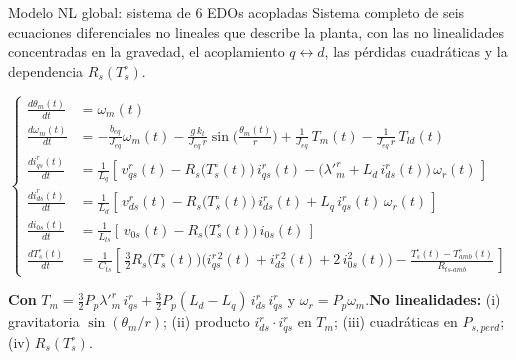 \documentclass[aspectratio=169,t]{beamer}
\begin{document}
\begin{frame}{Modelo NL global: sistema de 6 EDOs acopladas}
{\small\color{uncGray}Sistema completo de seis ecuaciones diferenciales no lineales que describe la planta, con las no linealidades concentradas en la gravedad, el acoplamiento $q\!\leftrightarrow\!d$, las pérdidas cuadráticas y la dependencia $R_s(T_s^\circ)$.}\par
\vspace{2mm}

\footnotesize
\begin{equation*}
\left\{
\begin{aligned}
\frac{d\theta_m(t)}{dt} &= \omega_m(t) \\[1pt]
\frac{d\omega_m(t)}{dt} &= -\tfrac{b_{eq}}{J_{eq}}\omega_m(t) - \tfrac{g\,k_l}{J_{eq}\,r}\sin\!\big(\tfrac{\theta_m(t)}{r}\big) + \tfrac{1}{J_{eq}}\,T_m(t) - \tfrac{1}{J_{eq}\,r}\,T_{ld}(t) \\[1pt]
\frac{di_{qs}^{r}(t)}{dt} &= \tfrac{1}{L_q}\!\left[\,v_{qs}^{r}(t) - R_s\!\big(T_s^\circ(t)\big)\, i_{qs}^{r}(t) - \big(\lambda'^r_m + L_d\,i_{ds}^{r}(t)\big)\,\omega_r(t)\,\right] \\[1pt]
\frac{di_{ds}^{r}(t)}{dt} &= \tfrac{1}{L_d}\!\left[\,v_{ds}^{r}(t) - R_s\!\big(T_s^\circ(t)\big)\, i_{ds}^{r}(t) + L_q\,i_{qs}^{r}(t)\,\omega_r(t)\,\right] \\[1pt]
\frac{di_{0s}(t)}{dt} &= \tfrac{1}{L_{ls}}\!\left[\,v_{0s}(t) - R_s\!\big(T_s^\circ(t)\big)\, i_{0s}(t)\,\right] \\[1pt]
\frac{dT_s^\circ(t)}{dt} &= \tfrac{1}{C_{ts}}\!\left[\,\tfrac{3}{2}R_s\!\big(T_s^\circ(t)\big)\big(i_{qs}^{r\,2}(t)+i_{ds}^{r\,2}(t)+2\,i_{0s}^{2}(t)\big) - \tfrac{T_s^\circ(t) - T_{amb}^\circ(t)}{R_{ts\text{-}amb}}\,\right]
\end{aligned}\right.
\end{equation*}
\normalsize

\vspace{1mm}
{\small \textbf{Con} $T_m = \tfrac{3}{2}P_p\lambda'^r_m\,i_{qs}^{r} + \tfrac{3}{2}P_p(L_d-L_q)\,i_{ds}^{r}\,i_{qs}^{r}$ \;y\; $\omega_r = P_p\omega_m$.\quad \textbf{No linealidades:} (i) gravitatoria $\sin(\theta_m/r)$; (ii) producto $i_{ds}^{r}\!\cdot\! i_{qs}^{r}$ en $T_m$; (iii) cuadráticas en $P_{s,perd}$; (iv) $R_s(T_s^\circ)$.}
\end{frame}
\end{document}
